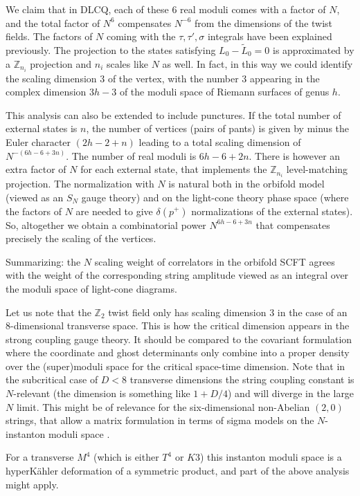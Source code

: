 \documentclass[nohyper,12pt,letterpaper]{JHEP3}
\def\IZ{{\mathbb Z}}           %
\def \tilde{\widetilde}
\begin{document}
We claim that in DLCQ, each of these $6$ real moduli comes with a factor
of $N$, and the total factor of $N^6$ compensates $N^{-6}$ from the
dimensions of the twist fields. The factors of $N$ coming with the
$\tau,\tau',\sigma$ integrals have been explained previously. The
projection to the states satisfying $L_0-\tilde L_0=0$ is approximated by
a $\IZ_{n_i}$ projection and $n_i$ scales like $N$ as well. In fact, in 
this way we could identify the scaling dimension $3$ of the vertex, with 
the number $3$ appearing in the complex dimension $3h-3$ of the moduli 
space of Riemann surfaces of genus $h$.

This analysis can also be extended to include punctures. If the total 
number of external states is $n$, the number of vertices (pairs of pants) 
is given by minus the Euler character $(2h-2+n)$ leading to a total 
scaling dimension of $N^{-(6h-6+3n)}$.  
The number of real moduli is $6h-6+2n$.
There is however an extra factor 
of $N$ for each external state, that implements the $\IZ_{n_i}$ 
level-matching projection. The normalization with $N$ is natural both in 
the orbifold model (viewed as an $S_N$ gauge theory) and on the light-cone 
theory phase space  (where the factors of $N$ are needed to give
$\delta(p^+)$ normalizations of the external states). So, altogether we 
obtain a combinatorial power $N^{6h-6+3n}$ that compensates precisely the 
scaling  of the vertices.

Summarizing: the $N$ scaling weight of correlators in the orbifold SCFT 
agrees with the weight of the corresponding string amplitude viewed as an 
integral over the moduli space of light-cone diagrams.

Let us note that the $\IZ_2$ twist field only has scaling 
dimension $3$ in the case of an 8-dimensional transverse space. This is 
how 
the critical dimension appears in the strong coupling gauge theory. It 
should be compared to the covariant formulation where the coordinate and 
ghost determinants only combine into a proper density over the 
(super)moduli space for the critical space-time dimension.  Note that in 
the subcritical case of  $D<8$ transverse dimensions the string coupling 
constant is $N$-relevant (the dimension is something like $1+D/4$)
and will diverge in the large $N$ limit. This 
might be of relevance for the six-dimensional non-Abelian $(2,0)$ strings, 
that allow a matrix formulation in terms of sigma models on the 
$N$-instanton  moduli space \cite{sixmatrixA}. 

For a transverse $M^4$ (which is either $T^4$ or $K3$) this instanton
moduli space is a hyperK\"a{}hler deformation of a symmetric product,
and part of the above analysis might apply.
\end{document}
